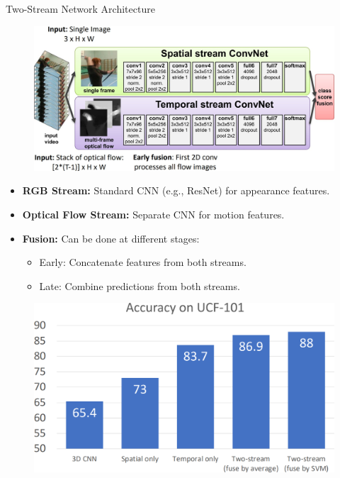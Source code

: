 \begin{frame}[allowframebreaks]{Two-Stream Network Architecture}
    \begin{figure}
        \centering
        \includegraphics[width=1\textwidth,height=0.9\textheight,keepaspectratio]{images/video/slide_23_1_img.jpg}
    \end{figure}
\framebreak
    \begin{itemize}
        \item \textbf{RGB Stream:} Standard CNN (e.g., ResNet) for appearance features.
        \item \textbf{Optical Flow Stream:} Separate CNN for motion features.
        \item \textbf{Fusion:} Can be done at different stages:
        \begin{itemize}
            \item Early: Concatenate features from both streams.
            \item Late: Combine predictions from both streams.
        \end{itemize}
    \end{itemize}
\framebreak
    \begin{figure}
        \centering
        \includegraphics[width=1\textwidth,height=0.9\textheight,keepaspectratio]{images/video/slide_24_1_img.png}
    \end{figure}
\end{frame}